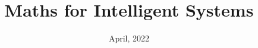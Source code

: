 

\renewcommand{\course}{Maths for Intelligent Systems}

\script

\usepackage[round]{natbib}


\renewcommand{\<}{\langle}
\renewcommand{\>}{\rangle}
\DeclareMathOperator{\vol}{vol}
\newcommand{\ul}{\underline}
\newcommand{\bd}{\boldsymbol}
\newcommand{\ve}[2]{\left[\arr{c}{#1\\#2}\right]}
\newcommand{\ma}[4]{\left[\arr{cc}{#1&#2\\#3&#4}\right]}
\renewcommand{\de}[4]{\left|\arr{cc}{#1&#2\\#3&#4}\right|}
\newcommand{\eig}{\text{eig}}
\renewcommand{\skew}{\text{skew}}


\newlength\rightmargintoc
\setlength\rightmargintoc{\linewidth}
\addtolength\rightmargintoc{-7em}

\makeatletter
\def\subsubsectocline#1#2#3#4#5{%
\parshape 2 4em \rightmargintoc \dimexpr\parindent+4em\relax \rightmargintoc
\@tempdima#3
\ifdim\lastskip=1sp;\relax\ \else\fi{\footnotesize#4}\hskip1sp%
}
\renewcommand*\l@subsubsection{\subsubsectocline{1}{0em}{2.5em}}
\makeatother



  \DefineShortVerb{\@}


\title{Maths for Intelligent Systems}
\date{April, 2022}



\maketitle

